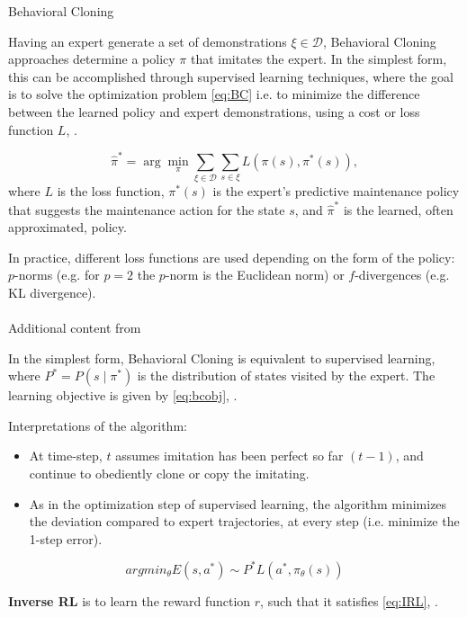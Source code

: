 \documentclass{article}
\begin{document}
Behavioral Cloning \cite{BC-bain1995}

Having an expert generate a set of demonstrations $\xi \in \mathcal{D}$, Behavioral Cloning approaches determine a policy $\pi$ that imitates the expert. In the simplest form, this can be accomplished through supervised learning techniques, where the goal is to solve the optimization problem \eqref{eq:BC} i.e. to minimize the difference between the learned policy and expert demonstrations, using a cost or loss function $L$, \citep{stanford-lectures}.  

\begin{equation}\label{eq:BC}
	\hat{\pi}^* = \arg\min_{\pi} \sum_{\xi \in \mathcal{D}} \sum_{s \in \xi} L(\pi(s), \pi^*(s)),
\end{equation}
where $L$ is the loss function, $\pi^*(s)$ is the expert's predictive maintenance policy that suggests the maintenance action for the state $s$, and $\hat{\pi}^*$ is the learned, often approximated, policy. 




In practice, different loss functions are used depending on the form of the policy: $p$-norms (e.g. for $p=2$ the $p$-norm is the Euclidean norm) or $f$-divergences (e.g. KL divergence). \\ \\

Additional content from \cite{yue2018imitation}

In the simplest form, Behavioral Cloning is equivalent to supervised learning, where $P^* = P(s\mid\pi^*)$ is the distribution of states visited by the expert. The learning objective is given by \eqref{eq:bcobj}, \cite{yue2018imitation}. 

Interpretations of the algorithm:
\begin{itemize}
	\item At time-step, $t$ assumes imitation has been perfect so far $(t-1)$, and continue to obediently clone or copy the imitating.
	\item As in the optimization step of supervised learning, the algorithm minimizes the deviation compared to expert trajectories, at every step (i.e. minimize the 1-step error).
\end{itemize}

\begin{equation}\label{eq:bcobj}
	argmin_\theta E(s,a^*) \sim P^* L(a^*, \pi_{\theta}(s))	
\end{equation}

\textbf{Inverse RL} is to learn the reward function $r$, such that it satisfies \eqref{eq:IRL}, \cite{yue2018imitation}.
\end{document}
